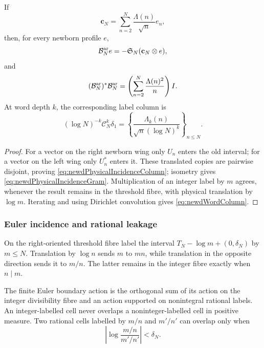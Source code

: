\begin{proposition}
\label{prop:newdPhysicalIncidence}
If
\[
 \mathbf c_N=\sum_{n=2}^N\frac{\Lambda(n)}{\sqrt n}e_n,
\]
then, for every newborn profile $e$,
\begin{equation}\label{eq:newdPhysicalIncidenceColumn}
 \mathcal B_N^{\rm ar}e=-\mathfrak S_N(\mathbf c_N\otimes e),
\end{equation}
and
\begin{equation}\label{eq:newdPhysicalIncidenceGram}
 (\mathcal B_N^{\rm ar})^*\mathcal B_N^{\rm ar}
 =\left(\sum_{n=2}^N\frac{\Lambda(n)^2}{n}\right)I.
\end{equation}
At word depth $k$, the corresponding label column is
\begin{equation}\label{eq:newdWordColumn}
 (\log N)^{-k}\mathscr C_N^k\delta_1
 =\left\{\frac{\Lambda_k(n)}
                {\sqrt n(\log N)^k}\right\}_{n\leq N}.
\end{equation}
\end{proposition}

\begin{proof}
For a vector on the right newborn wing only $U_n$ enters the old interval;
for a vector on the left wing only $U_n^*$ enters it.  These translated
copies are pairwise disjoint, proving
\eqref{eq:newdPhysicalIncidenceColumn}; isometry gives
\eqref{eq:newdPhysicalIncidenceGram}.  Multiplication of an integer label by
$m$ agrees, whenever the result remains in the threshold fibre, with
physical translation by $\log m$.  Iterating and using Dirichlet convolution
gives \eqref{eq:newdWordColumn}.
\end{proof}

\subsubsection{Euler incidence and rational leakage}

On the right-oriented threshold fibre label the interval
$T_N-\log m+(0,\delta_N)$ by $m\leq N$.  Translation by $\log n$ sends
$m$ to $mn$, while translation in the opposite direction sends it to
$m/n$.  The latter remains in the integer fibre exactly when $n\mid m$.

\begin{proposition}
\label{prop:newdLeakageSplit}
The finite Euler boundary action is the orthogonal sum of its action on the
integer divisibility fibre and an action supported on nonintegral rational
labels.  An integer-labelled cell never overlaps a noninteger-labelled cell
in positive measure.  Two rational cells labelled by $m/n$ and $m'/n'$ can
overlap only when
\begin{equation}\label{eq:newdOverlapCondition}
 \left|\log\frac{m/n}{m'/n'}\right|<\delta_N.
\end{equation}
\end{proposition}

